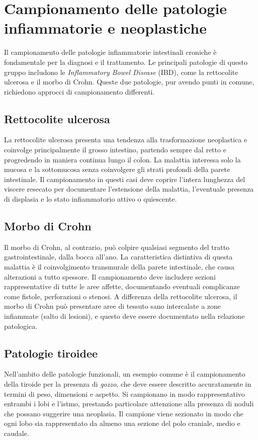 \section{Campionamento delle patologie infiammatorie e neoplastiche}
Il campionamento delle patologie infiammatorie intestinali croniche è fondamentale per la diagnosi e il trattamento. Le principali patologie di questo gruppo includono le \textit{Inflammatory Bowel Disease} (IBD), come la rettocolite ulcerosa e il morbo di Crohn. Queste due patologie, pur avendo punti in comune, richiedono approcci di campionamento differenti.

\subsection{Rettocolite ulcerosa}
La rettocolite ulcerosa presenta una tendenza alla trasformazione neoplastica e coinvolge principalmente il grosso intestino, partendo sempre dal retto e progredendo in maniera continua lungo il colon. La malattia interessa solo la mucosa e la sottomucosa senza coinvolgere gli strati profondi della parete intestinale. Il campionamento in questi casi deve coprire l'intera lunghezza del viscere resecato per documentare l'estensione della malattia, l'eventuale presenza di displasia e lo stato infiammatorio attivo o quiescente.

\subsection{Morbo di Crohn}
Il morbo di Crohn, al contrario, può colpire qualsiasi segmento del tratto gastrointestinale, dalla bocca all'ano. La caratteristica distintiva di questa malattia è il coinvolgimento transmurale della parete intestinale, che causa alterazioni a tutto spessore. Il campionamento deve includere sezioni rappresentative di tutte le aree affette, documentando eventuali complicanze come fistole, perforazioni o stenosi. A differenza della rettocolite ulcerosa, il morbo di Crohn può presentare aree di tessuto sano intercalate a zone infiammate (salto di lesioni), e questo deve essere documentato nella relazione patologica.

\subsection{Patologie tiroidee}
Nell'ambito delle patologie funzionali, un esempio comune è il campionamento della tiroide per la presenza di \textit{gozzo}, che deve essere descritto accuratamente in termini di peso, dimensioni e aspetto. Si campionano in modo rappresentativo entrambi i lobi e l'istmo, prestando particolare attenzione alla presenza di noduli che possano suggerire una neoplasia. Il campione viene sezionato in modo che ogni lobo sia rappresentato da almeno una sezione del polo craniale, medio e caudale.

